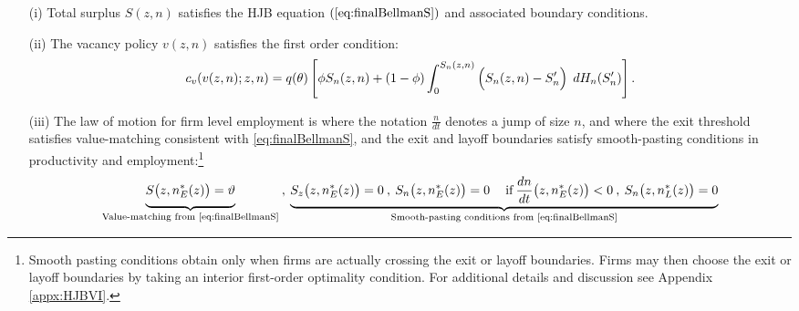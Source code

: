 \begin{itemize}
\item[(i)] Total surplus $S(z,n)$ satisfies the HJB equation $(\ref{eq:finalBellmanS})$ and associated boundary conditions.
\item[(ii)] The vacancy policy $v(z,n)$ satisfies the first order condition:
\vspace*{-.3cm}\begin{equation*}
c_v(v(z,n);z,n) = q(\theta)\left[\phi S_n(z,n) + (1-\phi)\int_0^{S_n(z,n)} \Big(S_n(z,n)-S_n^\prime\Big) \:\:dH_n(S_n^\prime)\right].
\vspace*{-.3cm}\end{equation*}
\item[(iii)] The law of motion for firm level employment is
\vspace*{-.3cm}{\small\begin{equation*}
\frac{dn}{dt}(z,n) =
\begin{cases}
-\frac{n}{dt} & n<n_{E}^{\ast}(z) \\
q(\theta)v(z,n)\Big[\phi+(1-\phi)H_n(S_{n}(z,n))\Big]
- n\Big[\delta + \lambda^E(\theta)(1-H_v(S_n(z,n)))\Big] & n\in\Big[n_{E}^{\ast}(z),n_{L}^{\ast}(z)\Big) \\
\frac{n^{\ast}_L(z)-n}{dt} & n\geq n_L^{\ast}(z),%
\end{cases}%
\vspace*{-.3cm}\end{equation*}}%
where the notation $\frac{n}{dt}$ denotes a jump of size $n$, and where the exit threshold satisfies value-matching consistent with \eqref{eq:finalBellmanS},
and the exit and layoff boundaries satisfy smooth-pasting conditions in productivity and employment:\footnote{
Smooth pasting conditions obtain only when firms are actually crossing the exit or layoff boundaries. Firms may then choose the exit or layoff boundaries by taking an interior first-order optimality condition.  For additional details and discussion see Appendix \ref{appx:HJBVI}.
}
\vspace*{-.3cm}\begin{equation*}
\underbrace{\Big.S\big(z,n^\ast_E(z)\big)=\vartheta\Big.}_{\text{Value-matching from \eqref{eq:finalBellmanS}}}
\:,\:
\underbrace{\Big.
S_z\big(z,n^\ast_E(z)\big) = 0 \:,\:
S_n\big(z,n^\ast_E(z)\big) = 0 \: \quad \text{if}\: \frac{dn}{dt}\big(z,n^\ast_E(z)\big) < 0\:,\:
S_n\big(z,n^\ast_L(z)\big) = 0 \Big.}_{
\text{Smooth-pasting conditions from \eqref{eq:finalBellmanS}}}
\vspace*{-.3cm}\end{equation*}

\end{itemize}
